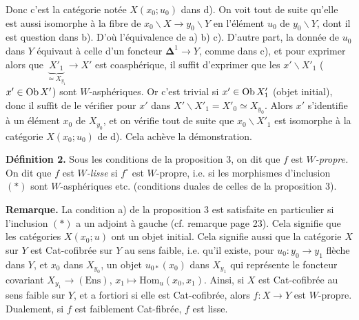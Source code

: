Donc c'est la catégorie notée $X(x_0;u_0)$ dans d). On voit tout de suite qu'elle est aussi isomorphe à la fibre de $x_0\backslash X \longrightarrow y_0\backslash Y$ en l'élément $u_0$ de $y_0\backslash Y$, dont il est question dans b). D'où l'équivalence de a) b) c). D'autre part, la donnée de $u_0$ dans $Y$ équivaut à celle d'un foncteur $\mathbf{\Delta}^1 \longrightarrow Y$, comme dans c), et pour exprimer alors que $\underbrace{X'_1}_{\simeq X_{y_1}} \longrightarrow X'$ est coasphérique, il suffit d'exprimer que les $x'\backslash X'_1$ ($x' \in \operatorname{Ob} X'$) sont $W$-asphériques. Or c'est trivial si $x' \in \operatorname{Ob} X'_1$ (objet initial), donc il suffit de le vérifier pour $x'$ dans $X'\backslash X'_1 = X'_0 \simeq X_{y_0}$. Alors $x'$ s'identifie à un élément $x_0$ de $X_{y_0}$, et on vérifie tout de suite que $x_0\backslash X'_1$ est isomorphe à la catégorie $X(x_0;u_0)$ de d). Cela achève la démonstration.


\textbf{Définition 2.} Sous les conditions de la proposition 3, on dit que $f$ est \textit{$W$-propre.} On dit que $f$ est \textit{$W$-lisse} si $f^{\circ}$ est $W$-propre, i.e. si les morphismes d'inclusion $(*)$ sont $W$-asphériques etc. (conditions duales de celles de la proposition 3).

\textbf{Remarque.} La condition a) de la proposition 3 est satisfaite en particulier si l'inclusion $(*)$ a un adjoint à gauche (cf. remarque page 23). Cela signifie que les catégories $X(x_0;u)$ ont un objet initial. Cela signifie aussi que la catégorie $X$ sur $Y$ est Cat-cofibrée sur $Y$ au sens faible, i.e. qu'il existe, pour $u_0 : y_0 \longrightarrow y_1$ flèche dans $Y$, et $x_0$ dans $X_{y_0}$, un objet $u_{0*}(x_0)$ dans $X_{y_1}$ qui représente le foncteur covariant $X_{y_1} \longrightarrow (\mathrm{Ens})$, $x_1 \longmapsto \mathrm{Hom}_u(x_0, x_1)$. Ainsi, si $X$ est Cat-cofibrée au sens faible sur $Y$, et a fortiori si elle est Cat-cofibrée, alors $f : X \longrightarrow Y$ est $W$-propre. Dualement, si $f$ est faiblement Cat-fibrée, $f$ est lisse.

